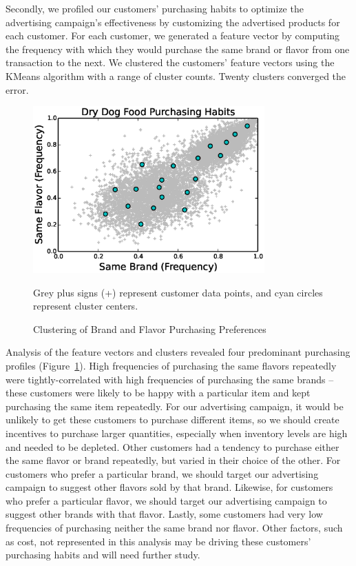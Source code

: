 Secondly, we profiled our customers' purchasing habits to optimize the advertising campaign's effectiveness by customizing the advertised products for each customer.  For each customer, we generated a feature vector by computing the frequency with which they would purchase the same brand or flavor from one transaction to the next.  We clustered the customers' feature vectors using the KMeans algorithm with a range of cluster counts. Twenty clusters converged the error.

\begin{figure}[!t]
  \centering
  \caption{Clustering of Brand and Flavor Purchasing Preferences}
  \includegraphics[width=3.5in]{figures/bigpetstore/cluster_analysis.eps}

  Grey plus signs (+) represent customer data points, and cyan circles represent cluster centers.
  \label{fig:cluster_analysis}
\end{figure}

Analysis of the feature vectors and clusters revealed four predominant purchasing profiles (Figure~\ref{fig:cluster_analysis}).  High frequencies of purchasing the same flavors repeatedly were tightly-correlated with high frequencies of purchasing the same brands -- these customers were likely to be happy with a particular item and kept purchasing the same item repeatedly.  For our advertising campaign, it would be unlikely to get these customers to purchase different items, so we should create incentives to purchase larger quantities, especially when inventory levels are high and needed to be depleted.  Other customers had a tendency to purchase either the same flavor or brand repeatedly, but varied in their choice of the other.  For customers who prefer a particular brand, we should target our advertising campaign to suggest other flavors sold by that brand.  Likewise, for customers who prefer a particular flavor, we should target our advertising campaign to suggest other brands with that flavor.  Lastly, some customers had very low frequencies of purchasing neither the same brand nor flavor.  Other factors, such as cost, not represented in this analysis may be driving these customers' purchasing habits and will need further study.


